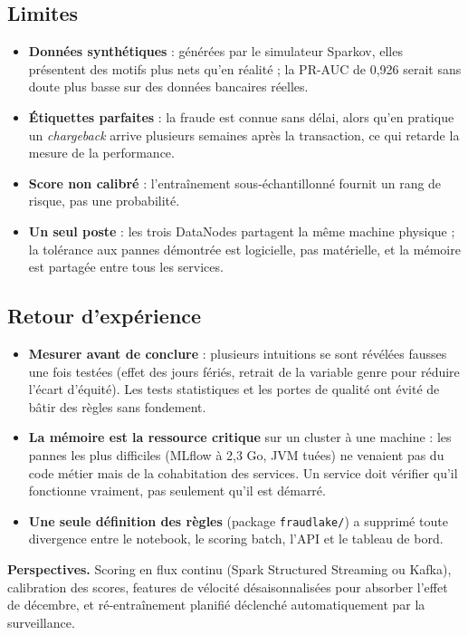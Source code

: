\documentclass[11pt,a4paper]{article}
\newcommand{\code}[1]{\texttt{\small #1}}
\begin{document}
\subsection*{Limites}
\begin{itemize}[leftmargin=*,itemsep=2pt]
  \item \textbf{Données synthétiques} : générées par le simulateur Sparkov, elles présentent des motifs plus nets qu'en réalité ; la
        PR-AUC de 0,926 serait sans doute plus basse sur des données bancaires réelles.
  \item \textbf{Étiquettes parfaites} : la fraude est connue sans délai, alors qu'en pratique un \emph{chargeback} arrive plusieurs
        semaines après la transaction, ce qui retarde la mesure de la performance.
  \item \textbf{Score non calibré} : l'entraînement sous-échantillonné fournit un rang de risque, pas une probabilité.
  \item \textbf{Un seul poste} : les trois DataNodes partagent la même machine physique ; la tolérance aux pannes démontrée est
        logicielle, pas matérielle, et la mémoire est partagée entre tous les services.
\end{itemize}

\subsection*{Retour d'expérience}
\begin{itemize}[leftmargin=*,itemsep=2pt]
  \item \textbf{Mesurer avant de conclure} : plusieurs intuitions se sont révélées fausses une fois testées (effet des jours fériés,
        retrait de la variable genre pour réduire l'écart d'équité). Les tests statistiques et les portes de qualité ont évité de
        bâtir des règles sans fondement.
  \item \textbf{La mémoire est la ressource critique} sur un cluster à une machine : les pannes les plus difficiles (MLflow à 2,3 Go,
        JVM tuées) ne venaient pas du code métier mais de la cohabitation des services. Un service doit vérifier qu'il fonctionne
        vraiment, pas seulement qu'il est démarré.
  \item \textbf{Une seule définition des règles} (package \code{fraudlake/}) a supprimé toute divergence entre le notebook, le scoring
        batch, l'API et le tableau de bord.
\end{itemize}

\textbf{Perspectives.} Scoring en flux continu (Spark Structured Streaming ou Kafka), calibration des scores, features de vélocité
désaisonnalisées pour absorber l'effet de décembre, et ré-entraînement planifié déclenché automatiquement par la surveillance.
\end{document}
